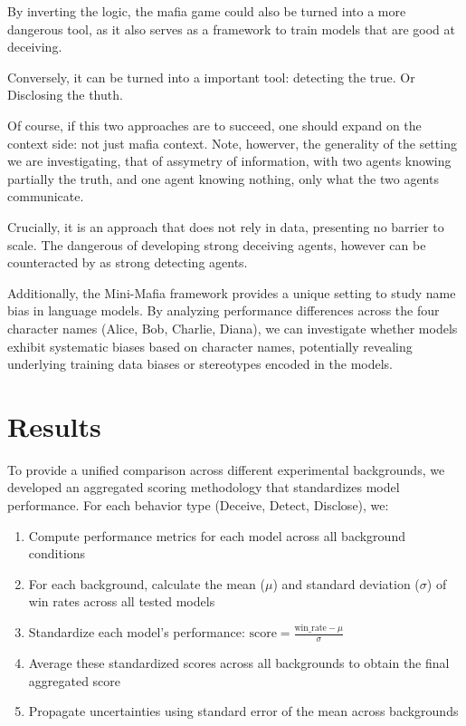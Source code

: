 \documentclass{article}
\begin{document}
By inverting the logic, the mafia game could also be turned into a more dangerous tool, as it also serves as a framework to train models that are good at deceiving.

Conversely, it can be turned into a important tool: detecting the true. Or Disclosing the thuth.

Of course, if this two approaches are to succeed, one should expand on the context side: not just mafia context. Note, howerver, the generality of the setting we are investigating, that of assymetry of information, with two agents knowing partially the truth, and one agent knowing nothing, only what the two agents communicate.

Crucially, it is an approach that does not rely in data, presenting no barrier to scale. The dangerous of developing strong deceiving agents, however can be counteracted by as strong detecting agents.

Additionally, the Mini-Mafia framework provides a unique setting to study name bias in language models. By analyzing performance differences across the four character names (Alice, Bob, Charlie, Diana), we can investigate whether models exhibit systematic biases based on character names, potentially revealing underlying training data biases or stereotypes encoded in the models.



\section{Results}

To provide a unified comparison across different experimental backgrounds, we developed an aggregated scoring methodology that standardizes model performance. For each behavior type (Deceive, Detect, Disclose), we:

\begin{enumerate}
    \item Compute performance metrics for each model across all background conditions
    \item For each background, calculate the mean ($\mu$) and standard deviation ($\sigma$) of win rates across all tested models
    \item Standardize each model's performance: $\text{score} = \frac{\text{win\_rate} - \mu}{\sigma}$
    \item Average these standardized scores across all backgrounds to obtain the final aggregated score
    \item Propagate uncertainties using standard error of the mean across backgrounds
\end{enumerate}
\end{document}
